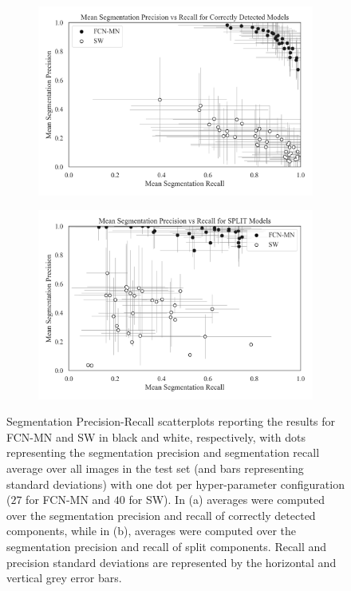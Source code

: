 \documentclass[a4paper,authoryear,review]{elsarticle}
\begin{document}
	\begin{figure}%
		\centering
		\begin{subfigure}[b]{0.97\textwidth}
			\centering
			\includegraphics[width=\textwidth]{figures/Figure5-a.png}
			\caption{}
			\label{fig:Figure5-a}
		\end{subfigure}
		\hfill
		\begin{subfigure}[b]{0.97\textwidth}
			\centering
			\includegraphics[width=\textwidth]{figures/Figure5-b.png}
			\caption{}
			\label{fig:Figure5-b}
		\end{subfigure}
		\caption{
			Segmentation Precision-Recall scatterplots reporting the results for FCN-MN and SW in black and white, respectively, with dots representing the segmentation precision and segmentation recall average over all images in the test set (and bars representing standard deviations) with one dot per hyper-parameter configuration ($27$ for FCN-MN  and $40$ for SW). In (a) averages were computed over the segmentation precision and recall of correctly detected components, while in (b), averages were computed over the segmentation precision and recall of split components. Recall and precision standard deviations are represented by the horizontal and vertical grey error bars.
		}%
		\label{fig:Figure5}%
	\end{figure}
	
\end{document}
